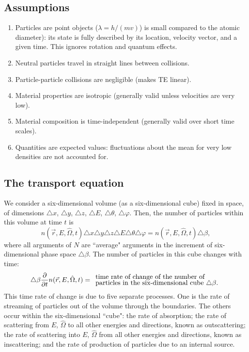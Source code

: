\documentclass[12pt]{article}
\newcommand{\rvec}{\ensuremath{\vec{r}}}
\newcommand{\omvec}{\ensuremath{\hat{\Omega}}}
\begin{document}
\subsection*{Assumptions}
\begin{enumerate}
\item Particles are point objects ($\lambda = h/(mv)$) is small compared to the atomic diameter): its state is fully described by its location, velocity vector, and a given time. This ignores rotation and quantum effects.

\item Neutral particles travel in straight lines between collisions.

\item Particle-particle collisions are negligible (makes TE linear).

\item Material properties are isotropic (generally valid unless velocities are very low).

\item Material composition is time-independent (generally valid over short time scales).

\item Quantities are expected values: fluctuations about the mean for very low densities are not accounted for.
\end{enumerate}

\subsection*{The transport equation}
We consider a six-dimensional volume (as a six-dimensional cube)
 fixed in space, of dimensions
$\triangle x$, $\triangle y$, $\triangle z$, $\triangle E$, $\triangle \theta$, $\triangle \varphi$.
Then, the number of particles within this volume at time $t$ is
\begin{equation*}
n(\rvec,E,\omvec,t)\triangle x\triangle y\triangle z\triangle E\triangle \theta\triangle \varphi =
n(\rvec,E,\omvec,t)\triangle \beta,
\end{equation*}
where all arguments of $N$ are ``average" arguments in the %
increment of six-dimensional phase space $\triangle \beta$.
The number of
particles in this cube changes with time:
\begin{equation*}
\triangle \beta\frac{\partial}{\partial t}n(\rvec,E,\omvec,t) = \begin{array}{l}
\text{time rate of change of the number of}\vspace{-0.1cm}\\
\text{particles in the six-dimensional cube $\triangle \beta$.}
\end{array}
\end{equation*}
 This time rate of change is due to five separate processes. One is the rate of streaming of
particles out of the volume through the boundaries. The others occur within the
six-dimensional ``cube": the rate
of absorption; the rate of scattering from $E$, $\omvec$ to all other energies and directions, known
as outscattering; the rate of scattering into $E$, $\omvec$ from all other energies and
 directions, known as inscattering; and the rate of production of particles due to an internal source.
\end{document}
